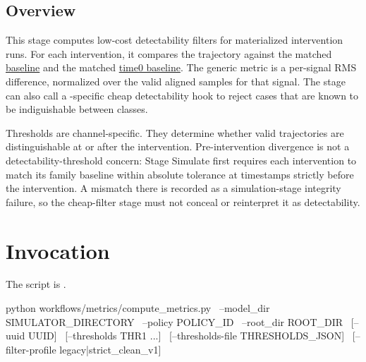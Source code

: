\documentclass[11pt]{article}
\begin{document}
\label{docstart:cheap_filter_metrics_stage}

\subsection*{Overview}
This stage computes low-cost detectability filters for materialized intervention runs.
For each intervention, it compares the trajectory against the matched \hyperref[sec:candidate-generation-baseline-recipe]{baseline} and the matched \hyperref[sec:candidate-generation-time0-baseline-recipe]{time0 baseline}.
The generic metric is a per-signal RMS difference, normalized over the valid aligned samples for that signal.
The stage can also call a \termSimulator-specific cheap detectability hook to reject cases that are known to be indiguishable between classes.

Thresholds are channel-specific.
They determine whether valid trajectories are distinguishable at or after the intervention.
Pre-intervention divergence is not a detectability-threshold concern: Stage Simulate first requires each intervention to match its family baseline within absolute tolerance  at timestamps strictly before the intervention.
A mismatch there is recorded as a simulation-stage integrity failure, so the cheap-filter stage must not conceal or reinterpret it as detectability.

\section*{Invocation}

The script is .

\begin{DocCode}
python workflows/metrics/compute_metrics.py \
  --model_dir SIMULATOR_DIRECTORY \
  --policy POLICY_ID \
  --root_dir ROOT_DIR \
  [--uuid UUID] \
  [--thresholds THR1 ...] \
  [--thresholds-file THRESHOLDS_JSON] \
  [--filter-profile legacy|strict_clean_v1] \
\end{DocCode}
\end{document}
